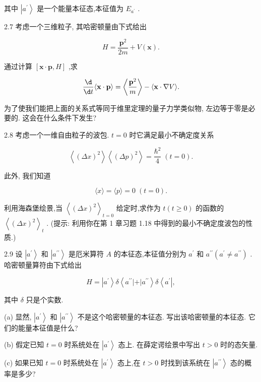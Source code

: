 其中 $\left| {a}^{\prime }\right\rangle$ 是一个能量本征态,本征值为 ${E}_{{a}^{\prime }}$ .

2.7 考虑一个三维粒子, 其哈密顿量由下式给出

$$
H = \frac{{\mathbf{p}}^{2}}{2m} + V\left( \mathbf{x}\right) .
$$

通过计算 $\left\lbrack {\mathbf{x} \cdot \mathbf{p}, H}\right\rbrack$ ,求

$$
\frac{\d}{\d t}\langle \mathbf{x} \cdot \mathbf{p}\rangle = \left\langle \frac{{\mathbf{p}}^{2}}{m}\right\rangle - \langle \mathbf{x} \cdot \nabla V\rangle .
$$

为了使我们能把上面的关系式等同于维里定理的量子力学类似物, 左边等于零是必要的. 这会在什么条件下发生?

2.8 考虑一个一维自由粒子的波包. $t = 0$ 时它满足最小不确定度关系

$$
\left\langle {\left( \Delta x\right) }^{2}\right\rangle \left\langle {\left( \Delta p\right) }^{2}\right\rangle = \frac{{\hbar }^{2}}{4}\;\left( {t = 0}\right) .
$$

此外, 我们知道

$$
\langle x\rangle = \langle p\rangle = 0\;\left( {t = 0}\right) .
$$

利用海森堡绘景,当 ${\left\langle {\left( \Delta x\right) }^{2}\right\rangle }_{t = 0}$ 给定时,求作为 $t\left( {t \geq 0}\right)$ 的函数的 ${\left\langle {\left( \Delta x\right) }^{2}\right\rangle }_{t}$ . (提示: 利用你在第 1 章习题 1.18 中得到的最小不确定度波包的性质.)

2.9 设 $\left| {a}^{\prime }\right\rangle$ 和 $\left| {a}^{\prime \prime }\right\rangle$ 是厄米算符 $A$ 的本征态,本征值分别为 ${a}^{\prime }$ 和 ${a}^{\prime \prime }\left( {{a}^{\prime } \neq {a}^{\prime \prime }}\right)$ . 哈密顿量算符由下式给出

$$
H = \left| {a}^{\prime }\right\rangle \delta \left\langle {{a}^{\prime \prime }\left| +\right| {a}^{\prime \prime }}\right\rangle \delta \left\langle {a}^{\prime }\right| ,
$$

其中 $\delta$ 只是个实数.

(a) 显然, $\left| {a}^{\prime }\right\rangle$ 和 $\left| {a}^{\prime \prime }\right\rangle$ 不是这个哈密顿量的本征态. 写出该哈密顿量的本征态. 它们的能量本征值是什么?

(b) 假定已知 $t = 0$ 时系统处在 $\left| {a}^{\prime }\right\rangle$ 态上. 在薛定谔绘景中写出 $t > 0$ 时的态矢量.

(c) 如果已知 $t = 0$ 时系统处在 $\left| {a}^{\prime }\right\rangle$ 态上,在 $t > 0$ 时找到该系统在 $\left| {a}^{\prime \prime }\right\rangle$ 态的概率是多少?

